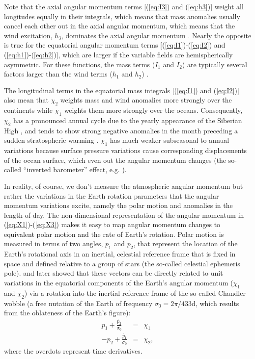 Note that the axial angular momentum terms [(\ref{eq:I3}) and (\ref{eq:h3})] weight all longitudes equally in their integrals, which means that mass anomalies usually cancel each other out in the axial angular momentum, which means that the wind excitation, $h_3$, dominates the axial angular momentum  \citep{barnesetal1983}.
%
Nearly the opposite is true for the equatorial angular momentum terms [(\ref{eq:I1})-(\ref{eq:I2}) and (\ref{eq:h1})-(\ref{eq:h2})], which are larger if the variable fields are hemispherically asymmetric.
For these functions, the mass terms ($I_1$ and $I_2$) are typically several factors larger than the wind terms ($h_1$ and $h_2$)  \citep{barnesetal1983}.

The longitudinal terms in the equatorial mass integrals [(\ref{eq:I1}) and (\ref{eq:I2})] also mean that $\chi_2$ weights mass and wind anomalies more strongly over the continents while $\chi_1$ weights them more strongly over the oceans.
Consequently, $\chi_2$ has a pronounced annual cycle due to the yearly appearance of the Siberian High \citep{dobslawetal2010}, and tends to show strong negative anomalies in the month preceding a sudden stratospheric warming \citep{Neef2014}.
$\chi_1$ has much weaker subseasonal to annual variations because surface pressure variations cause corresponding displacements of the ocean surface, which even out the angular momentum changes (the so-called ``inverted barometer'' effect, e.g. \citet{salsteinrosen1989}).

In reality, of course, we don't measure the atmospheric angular momentum but rather the variations in the Earth rotation parameters that the angular momentum variations excite, namely the polar motion and anomalies in the length-of-day. 
The non-dimensional representation of the angular momentum in (\ref{eq:X1})-(\ref{eq:X3}) makes it easy to map angular momentum changes to equivalent polar motion and the rate of Earth's rotation. 
Polar motion is measured in terms of two angles, $p_1$ and $p_2$, that represent the location of the Earth's rotational axis in an inertial, celestial reference frame that is fixed in space and defined relative to a group of stars (the so-called celestial ephemeris pole).
\citet{barnesetal1983} and later \citet{Gross1992} showed that these vectors can be directly related to unit variations in the equatorial components of the Earth's angular momentum ($\chi_1$ and $\chi_2$) via a rotation into the inertial reference frame of the so-called Chandler wobble (a free nutation of the Earth of frequency 
$\sigma_0 = 2\pi/ 433\text{d}$, which results from the oblateness of the Earth's figure):
\begin{eqnarray}
  p_1 + \frac{\dot{p_2}}{\sigma_0} &=& \chi_1 \\
  -p_2 + \frac{\dot{p_1}}{\sigma_0} &=& \chi_2,
\label{eq:X12_to_PM}
\end{eqnarray}
where the overdots represent time derivatives.

